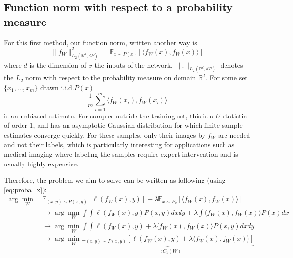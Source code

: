 \documentclass{article}
\begin{document}
\subsection{Function norm with respect to a probability measure}
For this first method, our function norm, written another way is
\begin{equation}
\| f_W\|_{L_2(\mathbb{R}^d, dP)}^2 = \mathbb{E}_{x \sim P(x)} \left[ \langle f_W(x), f_W(x) \rangle \right]
\end{equation}
where $d$ is the dimension of  $x$ the inputs of the network, $\| .\|_{L_2(\mathbb{R}^d, dP)}$ denotes the $L_2$ norm with respect to the probability measure on domain $\mathbb{R}^d$.  For some set $\{x_1, \dots ,x_m\}$ drawn i.i.d.\from $P(x)$
\begin{equation}
\frac{1}{m} \sum_{i=1}^m  \langle f_W(x_i), f_W(x_i) \rangle
\end{equation}
is an unbiased estimate.  For samples outside the training set, this is a $U$-statistic of order 1, and has an asymptotic Gaussian distribution for which finite sample estimates converge quickly\cite{lee1990u}.
For these samples, only their images by $f_W$ are needed and not their labels, which is particularly interesting for applications such as medical imaging 
where labeling the samples require expert intervention and is usually highly expensive.

Therefore, the problem we aim to solve can be written as following (using \eqref{eq:proba_x}):
\begin{align}
\arg\min_{W} \ &  \mathbb{E}_{(x,y)\sim P(x,y)}[\ell(f_W(x),y)] + \lambda \mathbb{E}_{x\sim P_x}[ \langle f_W(x), f_W(x) \rangle]\nonumber \\ &\rightarrow  \arg\min_{W} \int \int \ell(f_W(x),y) P(x,y) dxdy + \lambda \int \langle f_W(x), f_W(x) \rangle P(x) dx \nonumber \\ &\rightarrow  \arg\min_{W}\int \int \ell(f_W(x),y) + \lambda \langle f_W(x), f_W(x) \rangle  P(x,y) dxdy \nonumber \\ &\rightarrow \arg\min_{W} \underbrace{\mathbb{E}_{(x,y)\sim P(x,y)} [\ell(f_W(x),y) + \lambda \langle f_W(x), f_W(x) \rangle]}_{=: C_1(W)} 
\end{align}
\end{document}

